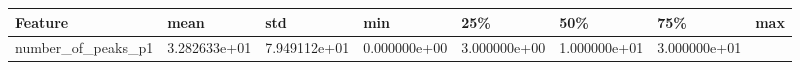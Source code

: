 \documentclass[11pt]{article}
\begin{document}
\begin{longtable}[]{@{}llllllll@{}}
\toprule
\begin{minipage}[b]{0.16\columnwidth}\raggedright
Feature\strut
\end{minipage} & \begin{minipage}[b]{0.09\columnwidth}\raggedright
mean\strut
\end{minipage} & \begin{minipage}[b]{0.09\columnwidth}\raggedright
std\strut
\end{minipage} & \begin{minipage}[b]{0.09\columnwidth}\raggedright
min\strut
\end{minipage} & \begin{minipage}[b]{0.09\columnwidth}\raggedright
25\%\strut
\end{minipage} & \begin{minipage}[b]{0.09\columnwidth}\raggedright
50\%\strut
\end{minipage} & \begin{minipage}[b]{0.09\columnwidth}\raggedright
75\%\strut
\end{minipage} & \begin{minipage}[b]{0.08\columnwidth}\raggedright
max\strut
\end{minipage}\tabularnewline
\midrule
\endhead
\begin{minipage}[t]{0.16\columnwidth}\raggedright
number\_of\_peaks\_p1\strut
\end{minipage} & \begin{minipage}[t]{0.09\columnwidth}\raggedright
3.282633e+01\strut
\end{minipage} & \begin{minipage}[t]{0.09\columnwidth}\raggedright
7.949112e+01\strut
\end{minipage} & \begin{minipage}[t]{0.09\columnwidth}\raggedright
0.000000e+00\strut
\end{minipage} & \begin{minipage}[t]{0.09\columnwidth}\raggedright
3.000000e+00\strut
\end{minipage} & \begin{minipage}[t]{0.09\columnwidth}\raggedright
1.000000e+01\strut
\end{minipage} & \begin{minipage}[t]{0.09\columnwidth}\raggedright
3.000000e+01\strut
\end{minipage} & \begin{minipage}[t]{0.08\columnwidth}\raggedright

\end{minipage}
\end{longtable}
\end{document}
